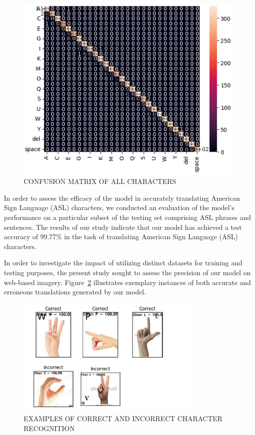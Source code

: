 \documentclass[conference]{IEEEtran}
\begin{document}
\begin{figure}[t!]
\centering
\includegraphics[width=14cm]{Images/confusion_matrix.png}
\caption{CONFUSION MATRIX OF ALL CHARACTERS}
\label{Fig:Figure5}
\end{figure}

In order to assess the efficacy of the model in accurately translating American Sign Language (ASL) characters, we conducted an evaluation of the model's performance on a particular subset of the testing set comprising ASL phrases and sentences. The results of our study indicate that our model has achieved a test accuracy of 99.77\% in the task of translating American Sign Language (ASL) characters.

In order to investigate the impact of utilizing distinct datasets for training and testing purposes, the present study sought to assess the precision of our model on web-based imagery. Figure~\ref{Fig:Figure6} illustrates exemplary instances of both accurate and erroneous translations generated by our model.

\begin{figure}[t!]
\centering
\includegraphics[width=9cm]{Images/correct_incorrect.png}
\caption{EXAMPLES OF CORRECT AND INCORRECT CHARACTER RECOGNITION}
\label{Fig:Figure6}
\end{figure}
\end{document}
